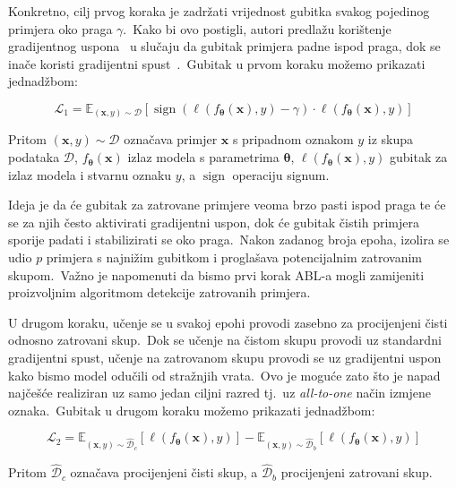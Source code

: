 \documentclass[diplomskirad]{fer}
\begin{document}
Konkretno, cilj prvog koraka je zadržati vrijednost gubitka svakog pojedinog primjera oko praga $\gamma$.\
Kako bi ovo postigli, autori predlažu korištenje gradijentnog uspona~\cite{basha2018impact} u slučaju da gubitak primjera padne ispod praga, dok se inače koristi gradijentni spust~\cite{ruder2016overview}.\ Gubitak u prvom koraku možemo prikazati jednadžbom:

\begin{equation}
  \mathcal{L}_1 = \mathbb{E}_{(\bm{x}, y) \sim \mathcal{D}} \left[ \operatorname{sign} \left( \ell(f_{\bm{\theta}}(\bm{x}), y) - \gamma \right) \cdot \ell(f_{\bm{\theta}}(\bm{x}), y) \right]
  \label{eq:abl1}
\end{equation}

Pritom $(\bm{x}, y) \sim \mathcal{D}$ označava primjer $\bm{x}$ s pripadnom oznakom $y$ iz skupa podataka $\mathcal{D}$, $f_{\bm{\theta}}(\bm{x})$ izlaz modela s parametrima $\bm{\theta}$, $\ell(f_{\bm{\theta}}(\bm{x}), y)$ gubitak za izlaz modela i stvarnu oznaku $y$, a $\operatorname{sign}$ operaciju signum.\ 
  
Ideja je da će gubitak za zatrovane primjere veoma brzo pasti ispod praga te će se za njih često aktivirati gradijentni uspon, dok će gubitak čistih primjera sporije padati i stabilizirati se oko praga.\ 
Nakon zadanog broja epoha, izolira se udio $p$ primjera s najnižim gubitkom i proglašava potencijalnim zatrovanim skupom.\ Važno je napomenuti da bismo prvi korak ABL-a mogli zamijeniti proizvoljnim algoritmom detekcije zatrovanih primjera.\ 
  
U drugom koraku, učenje se u svakoj epohi provodi zasebno za procijenjeni čisti odnosno zatrovani skup.\ 
Dok se učenje na čistom skupu provodi uz standardni gradijentni spust, učenje na zatrovanom skupu provodi se uz gradijentni uspon kako bismo model odučili od stražnjih vrata.\ 
Ovo je moguće zato što je napad najčešće realiziran uz samo jedan ciljni razred tj.\ uz \textit{all-to-one} način izmjene oznaka.\ Gubitak u drugom koraku možemo prikazati jednadžbom:

\begin{equation}
  \mathcal{L}_2 = \mathbb{E}_{(\bm{x}, y) \sim \hat{\mathcal{D}}_c} \left[ \ell(f_{\bm{\theta}}(\bm{x}), y) \right] - \mathbb{E}_{(\bm{x}, y) \sim \hat{\mathcal{D}}_b} \left[ \ell(f_{\bm{\theta}}(\bm{x}), y) \right]
  \label{eq:abl2}
\end{equation}

Pritom $\hat{\mathcal{D}}_c$ označava procijenjeni čisti skup, a $\hat{\mathcal{D}}_b$ procijenjeni zatrovani skup.\
\end{document}
